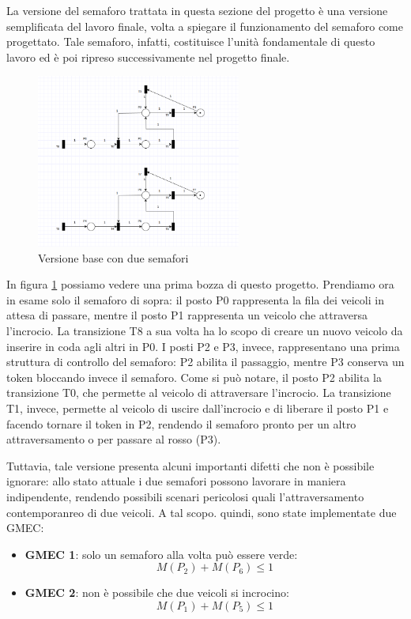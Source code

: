 La versione del semaforo trattata in questa sezione del progetto è una versione semplificata del lavoro finale, volta a spiegare il funzionamento del semaforo come progettato. Tale semaforo, infatti, costituisce l'unità fondamentale di questo lavoro ed è poi ripreso successivamente nel progetto finale.

\begin{figure}[H]
    \centering
    \includegraphics[width=0.6\textwidth]{figure/project_screenshots/semafori.png}
    \caption{Versione base con due semafori}
    \label{fig:semafori}
\end{figure}

In figura \ref{fig:semafori} possiamo vedere una prima bozza di questo progetto. Prendiamo ora in esame solo il semaforo di sopra: il posto P0 rappresenta la fila dei veicoli in attesa di passare, mentre il posto P1 rappresenta un veicolo che attraversa l'incrocio. La transizione T8 a sua volta ha lo scopo di creare un nuovo veicolo da inserire in coda agli altri in P0. I posti P2 e P3, invece, rappresentano una prima struttura di controllo del semaforo: P2 abilita il passaggio, mentre P3 conserva un token bloccando invece il semaforo. Come si può notare, il posto P2 abilita la transizione T0, che permette al veicolo di attraversare l'incrocio. La transizione T1, invece, permette al veicolo di uscire dall'incrocio e di liberare il posto P1 e facendo tornare il token in P2, rendendo il semaforo pronto per un altro attraversamento o per passare al rosso (P3).

Tuttavia, tale versione presenta alcuni importanti difetti che non è possibile ignorare: allo stato attuale i due semafori possono lavorare in maniera indipendente, rendendo possibili scenari pericolosi quali l'attraversamento contemporanreo di due veicoli. A tal scopo. quindi, sono state implementate due GMEC: 

\begin{itemize}
    \item \textbf{GMEC 1}: solo un semaforo alla volta può essere verde:
    \begin{equation}
        M(P_{2}) + M(P_{6}) \leq 1
    \end{equation}

    \item \textbf{GMEC 2}: non è possibile che due veicoli si incrocino:
    \begin{equation}
        M(P_{1}) + M(P_{5}) \leq 1
    \end{equation}
\end{itemize}

